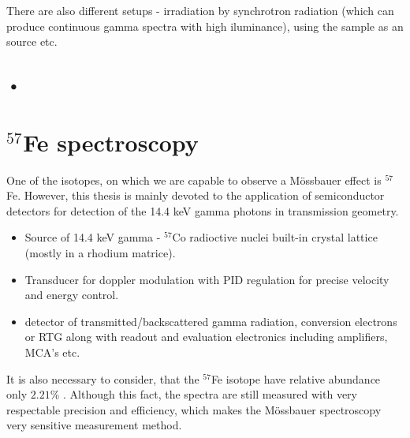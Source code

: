 \par
There are also different setups - irradiation by synchrotron radiation (which can produce continuous gamma spectra with high iluminance), using the sample as an source etc.

\subsection*{•}

\section{$^{57}$Fe spectroscopy}

One of the isotopes, on which we are capable to observe a Mössbauer effect is $^{57}$Fe. However, this thesis is mainly devoted to the application of semiconductor detectors for detection of the 14.4 keV gamma photons in transmission geometry.

\begin{itemize}

\item Source of 14.4 keV gamma - $^{57}$Co radioctive nuclei built-in crystal lattice (mostly in a rhodium matrice).
\item Transducer for doppler modulation with PID regulation for precise velocity and energy control. 
\item detector of transmitted/backscattered gamma radiation, conversion electrons or RTG along with readout and evaluation electronics including amplifiers, MCA's etc.

\end{itemize}



It is also necessary to consider, that the $^{57}$Fe isotope have relative abundance only $2.21 \%$ \cite{compounds}. Although this fact, the spectra are still measured with very respectable precision and efficiency, which makes the Mössbauer spectroscopy very sensitive measurement method.
